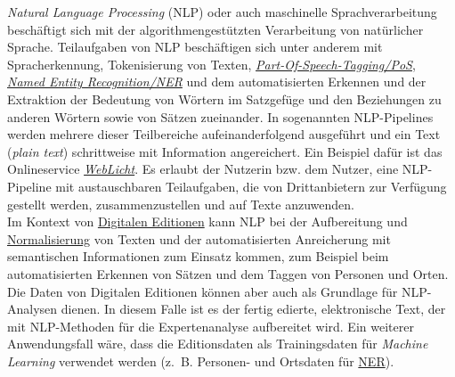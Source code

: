 \documentclass{article}
\begin{document}
    \emph{Natural Language Processing} (NLP) oder auch maschinelle
                  Sprachverarbeitung beschäftigt sich mit der algorithmengestützten Verarbeitung von
                  natürlicher Sprache. Teilaufgaben von NLP beschäftigen sich unter anderem mit
                  Spracherkennung, Tokenisierung von Texten, \emph{\href{http://gams.uni-graz.at/o:konde.156}{Part-Of-Speech-Tagging/PoS}}, \emph{\href{http://gams.uni-graz.at/o:konde.141}{Named Entity Recognition/NER}} und dem automatisierten Erkennen und der Extraktion der Bedeutung von
                  Wörtern im Satzgefüge und den Beziehungen zu anderen Wörtern sowie von Sätzen
                  zueinander. In sogenannten NLP-Pipelines werden mehrere dieser Teilbereiche
                  aufeinanderfolgend ausgeführt und ein Text (\emph{plain text})
                  schrittweise mit Information angereichert. Ein Beispiel dafür ist das
                  Onlineservice \emph{\href{http://gams.uni-graz.at/o:konde.212}{WebLicht}}. Es erlaubt der Nutzerin bzw. dem Nutzer, eine NLP-Pipeline mit
                  austauschbaren Teilaufgaben, die von Drittanbietern zur Verfügung gestellt werden,
                  zusammenzustellen und auf Texte anzuwenden. \\
            
        Im Kontext von \href{http://gams.uni-graz.at/o:konde.59}{Digitalen Editionen}
                  kann NLP bei der Aufbereitung und \href{http://gams.uni-graz.at/o:konde.146}{Normalisierung} von Texten und der automatisierten Anreicherung mit
                  semantischen Informationen zum Einsatz kommen, zum Beispiel beim automatisierten
                  Erkennen von Sätzen und dem Taggen von Personen und Orten. Die Daten von Digitalen
                  Editionen können aber auch als Grundlage für NLP-Analysen dienen. In diesem Falle
                  ist es der fertig edierte, elektronische Text, der mit NLP-Methoden für die
                  Expertenanalyse aufbereitet wird. Ein weiterer Anwendungsfall wäre, dass die
                  Editionsdaten als Trainingsdaten für \emph{Machine Learning}
                  verwendet werden (z. B. Personen- und Ortsdaten für \href{http://gams.uni-graz.at/o:konde.141}{NER}). \\
            
\end{document}
